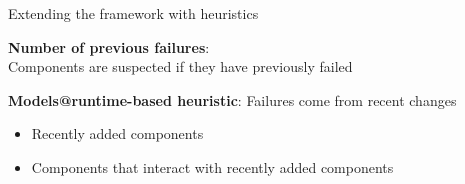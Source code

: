 \documentclass[10pt,xcolor={dvipsnames}]{beamer}
\begin{document}
	\begin{frame}{Extending the framework with heuristics}
		\begin{example}
			\textbf{Number of previous failures}: \\ Components are suspected if they have previously failed
		\end{example}
		\begin{example}
			\textbf{Models@runtime-based heuristic}: Failures come from recent changes
			\begin{itemize}
				\item Recently added components
				\item Components that interact with recently added components
			\end{itemize}
		\end{example}
	\end{frame}
	
\end{document}

